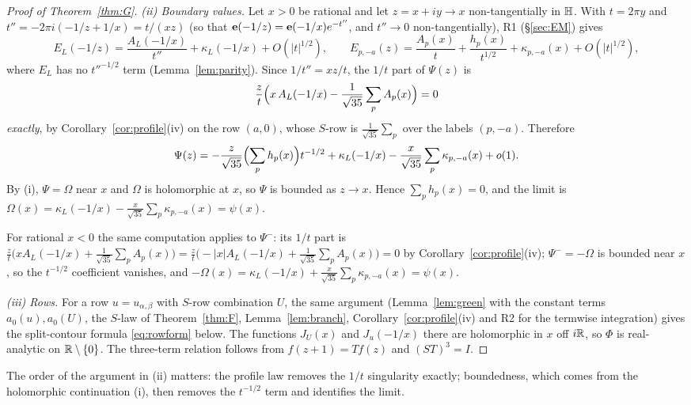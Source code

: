 \begin{proof}[Proof of Theorem~\ref{thm:G}]
\emph{(ii) Boundary values.} Let $x>0$ be rational and let $z=x+iy\to x$ non-tangentially in $\mathbb{H}$. With $t=2\pi y$ and $t''=-2\pi i(-1/z+1/x)=t/(xz)$
(so that $\mathbf{e}(-1/z)=\mathbf{e}(-1/x)e^{-t''}$, and $t''\to0$ non-tangentially), R1 (\S\ref{sec:EM}) gives
\[
E_L(-1/z)=\frac{A_L(-1/x)}{t''}+\kappa_L(-1/x)+O(|t|^{1/2}),\qquad E_{p,-a}(z)=\frac{A_p(x)}{t}+\frac{h_p(x)}{t^{1/2}}+\kappa_{p,-a}(x)+O(|t|^{1/2}),
\]
where $E_L$ has no $t''^{-1/2}$ term (Lemma~\ref{lem:parity}). Since $1/t''=xz/t$, the $1/t$ part of $\Psi(z)$ is
\[
\frac{z}{t}\Bigl(x\,A_L(-1/x)-\frac1{\sqrt{35}}\sum_pA_p(x)\Bigr)=0
\]
\emph{exactly}, by Corollary~\ref{cor:profile}(iv) on the row $(a,0)$, whose $S$-row is $\frac1{\sqrt{35}}\sum_p$ over the labels $(p,-a)$. Therefore
\[
\Psi(z)=-\frac{z}{\sqrt{35}}\Bigl(\sum_ph_p(x)\Bigr)t^{-1/2}+\kappa_L(-1/x)-\frac{x}{\sqrt{35}}\sum_p\kappa_{p,-a}(x)+o(1).
\]
By (i), $\Psi=\Omega$ near $x$ and $\Omega$ is holomorphic at $x$, so $\Psi$ is bounded as $z\to x$. Hence $\sum_ph_p(x)=0$, and the limit is
$\Omega(x)=\kappa_L(-1/x)-\frac{x}{\sqrt{35}}\sum_p\kappa_{p,-a}(x)=\psi(x)$.

For rational $x<0$ the same computation applies to $\Psi^-$: its $1/t$ part is $\frac zt\bigl(xA_L(-1/x)+\frac1{\sqrt{35}}\sum_pA_p(x)\bigr)=\frac zt\bigl(-|x|A_L(-1/x)+\frac1{\sqrt{35}}\sum_pA_p(x)\bigr)=0$
by Corollary~\ref{cor:profile}(iv); $\Psi^-=-\Omega$ is bounded near $x$, so the $t^{-1/2}$ coefficient vanishes, and
$-\Omega(x)=\kappa_L(-1/x)+\frac{x}{\sqrt{35}}\sum_p\kappa_{p,-a}(x)=\psi(x)$.

\emph{(iii) Rows.} For a row $u=u_{\alpha,\beta}$ with $S$-row combination $U$, the same argument (Lemma~\ref{lem:green} with the constant terms $a_0(u),a_0(U)$,
the $S$-law of Theorem~\ref{thm:F}, Lemma~\ref{lem:branch}, Corollary~\ref{cor:profile}(iv) and R2 for the termwise integration) gives the split-contour formula
\eqref{eq:rowform} below. The functions $J_U(x)$ and $J_u(-1/x)$ there are holomorphic in $x$ off $i\mathbb{R}$, so $\Phi$ is real-analytic on $\mathbb{R}\setminus\{0\}$. The
three-term relation follows from $f(z+1)=Tf(z)$ and $(ST)^3=I$.
\end{proof}
The order of the argument in (ii) matters: the profile law removes the $1/t$ singularity exactly; boundedness, which comes from the holomorphic
continuation (i), then removes the $t^{-1/2}$ term and identifies the limit.


